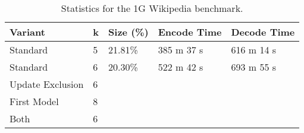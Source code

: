 \documentclass{article}
\begin{document}
\begin{table}[]
\caption{Statistics for the 1G Wikipedia benchmark.}
\label{wiki9}
\begin{center}

\begin{tabular}{|l|l|l|l|l|}
\hline
Variant          & k & Size (\%) & Encode Time & Decode Time \\ \hline
Standard         & 5 & 21.81\%   & 385 m 37 s  & 616 m 14 s  \\ \hline
Standard         & 6 & 20.30\%   & 522 m 42 s  & 693 m 55 s  \\ \hline
Update Exclusion & 6 &     &     &     \\ \hline
First Model      & 8 &     &    &    \\ \hline
Both             & 6 &     &    &    \\ \hline
\end{tabular}
\end{center}

\end{table}
\end{document}
